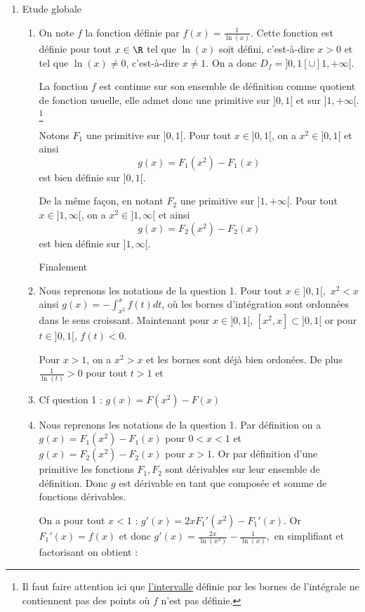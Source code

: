 \documentclass[a4paper, 11pt,reqno]{article}
\begin{document}
\begin{correction}
\begin{enumerate}
\item Etude globale
\begin{enumerate}
\item On note $f$ la fonction définie par $f(x)=\frac{1}{\ln(x)}$.
Cette fonction est définie pour tout $x\in \R$ tel que $\ln(x)$ soit défini, c'est-à-dire $x>0$ et tel que $\ln(x)\neq0$, c'est-à-dire $x\neq 1$. On a donc $D_f =  ]0,1[\cup ]1,+\infty[$. 

La fonction $f$ est continue  sur son ensemble de définition comme quotient de fonction usuelle, elle admet donc une primitive sur $]0,1[$ et sur $]1,+\infty[$. \footnote{Il faut faire attention ici que \underline{l'intervalle} définie par les bornes de l'intégrale ne contiennent pas des points où $f$ n'est pas définie. } 

Notons $F_1$ une primitive sur $]0,1[$. Pour tout $x\in ]0,1[$, on a $x^2\in ]0,1[$ et ainsi $$g(x)=F_1(x^2)-F_1(x)$$ est bien définie sur $]0,1[$. 

De la même façon, en notant $F_2$ une primitive sur $]1,+\infty[$. Pour tout $x\in ]1,\infty[$, on a $x^2\in ]1,\infty[$ et ainsi $$g(x)=F_2(x^2)-F_2(x)$$ est bien définie sur $]1,\infty[$. 

Finalement 
\conclusion{ $D_g =]0,1[\cup ]1,+\infty[$}
\item 
Nous reprenons les notations de la question 1. Pour tout $x\in ]0,1[, $ $x^2<x$ ainsi $g(x) = -\int_{x^2}^x f(t)dt$, où les bornes d'intégration sont ordonnées dans le sens croissant. Maintenant pour $x\in ]0,1[$,  $[x^2,x] \subset ]0,1[$ or pour $t\in ]0,1[$, $f(t) < 0$. 
\conclusion{ Ainsi $g(x)>0$ sur $]0,1[$. }

Pour $x>1$, on a $x^2>x$ et les bornes sont déjà bien ordonées. De plus $\frac{1}{\ln(t)}>0$ pour tout $t>1$ et 
\conclusion{ On a bien $g(x)>0$ sur $]1,+\infty[$. }


\item Cf question 1 : $g(x) = F (x^2) - F(x)$
\item Nous reprenons les notations de la question 1. Par définition on  a
$g(x) = F_1 (x^2) - F_1(x)$ pour $0<x<1$ et $g(x) = F_2 (x^2) - F_2(x)$ pour $x>1$. Or par définition d'une primitive les fonctions $F_1, F_2$ sont dérivables sur leur ensemble de définition. Donc $g$ est dérivable en tant que composée et somme de fonctions dérivables. 

On  a pour tout $x<1$ : $g'(x) = 2xF_1'(x^2) - F_1'(x)$. Or $F_1'(x) =f(x)$ et donc 
$g'(x) =\frac{2x}{\ln(x^2)}-\frac{1}{\ln(x)},  $ en simplifiant et factorisant on obtient : 


\end{enumerate}
\end{enumerate}
\end{correction}
\end{document}
